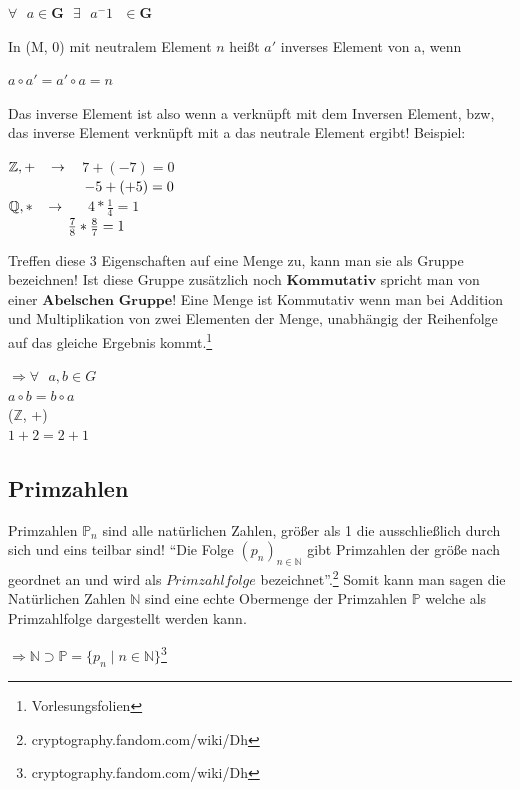 \documentclass[a4paper,12pt]{scrartcl}
\begin{document}
 \begin{center}
$\forall \text{  } a \in \textbf{G} \text{ } \exists \text{ } a^-1 \text{ } \in \textbf{G}$
\end{center}

 In (M, 0) mit neutralem Element $n$ heißt $a'$ inverses Element von a, wenn
 \begin{center}
 
 $a \circ a' = a' \circ a = n$
\end{center}
Das inverse Element ist also wenn a verknüpft mit dem Inversen Element, bzw, das inverse Element verknüpft mit a das neutrale Element ergibt!
Beispiel:
\begin{center}
 $\mathbb{Z, +} \hspace{3mm} \rightarrow \hspace{3mm}$
$7 + (-7) = 0$\\
$\hspace{19mm} -5 + (+5) = 0$\\

$\mathbb{Q, *} \hspace{3mm} \rightarrow \hspace{5mm}$
$4 * \frac{1}{4} = 1 \text{           }$\\
$\hspace{15mm} \frac{7}{8} * \frac{8}{7} = 1$
\end{center}

Treffen diese 3 Eigenschaften auf eine Menge zu, kann man sie als Gruppe bezeichnen!
Ist diese Gruppe zusätzlich noch $\textbf{Kommutativ}$ spricht man von einer $\textbf{Abelschen Gruppe}$!
Eine Menge ist Kommutativ wenn man bei Addition und Multiplikation von zwei Elementen der Menge, unabhängig der Reihenfolge auf das gleiche Ergebnis kommt.\footnote{Vorlesungsfolien}

\begin{center}
 $\Rightarrow \forall \text{ } a,b \in G$\\
 $a \circ b = b \circ a$\\
 ($\mathbb{Z}$, +)\\
 $1 + 2 = 2 + 1$
\end{center}





\newpage
\subsection{Primzahlen}

Primzahlen $\mathbb{P}_{n}$ sind alle natürlichen Zahlen, größer als 1 die ausschließlich durch sich und eins teilbar sind!\newline
``Die Folge ${\displaystyle \left(p_{n}\right)_{n\in \mathbb {N} }}$ gibt Primzahlen der größe nach geordnet an und wird als $Primzahlfolge$ bezeichnet''.\footnote{cryptography.fandom.com/wiki/Dh}
Somit kann man sagen die Natürlichen Zahlen $\mathbb{N}$ sind eine echte Obermenge der Primzahlen $\mathbb{P}$ welche als Primzahlfolge dargestellt werden kann.
\begin{center}
$\Rightarrow \displaystyle \mathbb {N} \supset \mathbb {P} =\{p_{n}\mid n\in \mathbb {N} \}$\footnote{cryptography.fandom.com/wiki/Dh}
\end{center}
\end{document}
